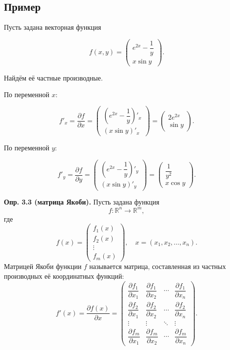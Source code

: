 \documentclass[a4paper,12pt]{article}
\begin{document}
\subsection*{Пример}

Пусть задана векторная функция

\[
f(x,y)
=
\begin{pmatrix}
e^{2x}-\dfrac{1}{y}\\
x\sin y
\end{pmatrix}.
\]

Найдём её частные производные.

По переменной $x$:

\[
f'_x
=
\frac{\partial f}{\partial x}
=
\begin{pmatrix}
\left(e^{2x}-\dfrac{1}{y}\right)'_x\\
(x\sin y)'_x
\end{pmatrix}
=
\begin{pmatrix}
2e^{2x}\\
\sin y
\end{pmatrix}.
\]

По переменной $y$:

\[
f'_y
=
\frac{\partial f}{\partial y}
=
\begin{pmatrix}
\left(e^{2x}-\dfrac{1}{y}\right)'_y\\
(x\sin y)'_y
\end{pmatrix}
=
\begin{pmatrix}
\dfrac{1}{y^2}\\
x\cos y
\end{pmatrix}.
\]

\begin{definitionbox}
\textbf{Опр. 3.3 (матрица Якоби).}
Пусть задана функция
\[
f:\mathbb{R}^n\to\mathbb{R}^m,
\]
где
\[
f(x)
=
\begin{pmatrix}
f_1(x)\\
f_2(x)\\
\vdots\\
f_m(x)
\end{pmatrix},
\quad
x=(x_1,x_2,\ldots,x_n).
\]
Матрицей Якоби функции $f$ называется матрица, составленная из частных производных её координатных функций:
\[
f'(x)
=
\frac{\partial f(x)}{\partial x}
=
\begin{pmatrix}
\dfrac{\partial f_1}{\partial x_1}
&
\dfrac{\partial f_1}{\partial x_2}
&
\cdots
&
\dfrac{\partial f_1}{\partial x_n}
\\[8pt]
\dfrac{\partial f_2}{\partial x_1}
&
\dfrac{\partial f_2}{\partial x_2}
&
\cdots
&
\dfrac{\partial f_2}{\partial x_n}
\\
\vdots
&
\vdots
&
\ddots
&
\vdots
\\[4pt]
\dfrac{\partial f_m}{\partial x_1}
&
\dfrac{\partial f_m}{\partial x_2}
&
\cdots
&
\dfrac{\partial f_m}{\partial x_n}
\end{pmatrix}.
\]
\end{definitionbox}
\end{document}
